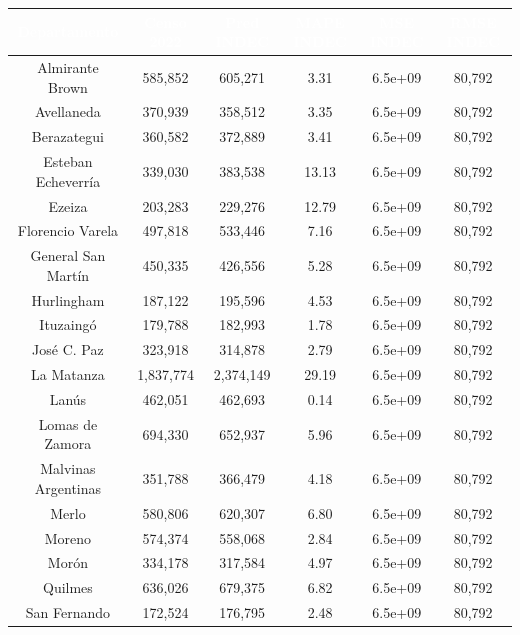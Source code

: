 \documentclass{article}
\theoremstyle{mytheoremstyle}
\theoremstyle{mytheoremstyle}
\theoremstyle{myproblemstyle}
\begin{document}
\begin{table}[htb!]
      \centering
      \begin{tabular}{|c|c|c|c|c|c|}
      \hline
      \textbf{\cellcolor[rgb]{0,0.231,0.427}\textcolor{white}{Departamento}} & \textbf{\cellcolor[rgb]{0,0.231,0.427}\textcolor{white}{Censo 2022}} & \textbf{\cellcolor[rgb]{0,0.231,0.427}\textcolor{white}{Pred INDEC}} & \textbf{\cellcolor[rgb]{0,0.231,0.427}\textcolor{white}{MAPE INDEC}} & \textbf{\cellcolor[rgb]{0,0.231,0.427}\textcolor{white}{MSE INDEC}} & \textbf{\cellcolor[rgb]{0,0.231,0.427}\textcolor{white}{RMSE INDEC}} \\ \hline
      Almirante Brown & 585,852 & 605,271 & 3.31 & 6.5e+09 & 80,792 \\
      Avellaneda & 370,939 & 358,512 & 3.35 & 6.5e+09 & 80,792 \\
      Berazategui & 360,582 & 372,889 & 3.41 & 6.5e+09 & 80,792 \\
      Esteban Echeverría & 339,030 & 383,538 & 13.13 & 6.5e+09 & 80,792 \\
      Ezeiza & 203,283 & 229,276 & 12.79 & 6.5e+09 & 80,792 \\
      Florencio Varela & 497,818 & 533,446 & 7.16 & 6.5e+09 & 80,792 \\
      General San Martín & 450,335 & 426,556 & 5.28 & 6.5e+09 & 80,792 \\
      Hurlingham & 187,122 & 195,596 & 4.53 & 6.5e+09 & 80,792 \\
      Ituzaingó & 179,788 & 182,993 & 1.78 & 6.5e+09 & 80,792 \\
      José C. Paz & 323,918 & 314,878 & 2.79 & 6.5e+09 & 80,792 \\
      La Matanza & 1,837,774 & 2,374,149 & 29.19 & 6.5e+09 & 80,792 \\
      Lanús & 462,051 & 462,693 & 0.14 & 6.5e+09 & 80,792 \\
      Lomas de Zamora & 694,330 & 652,937 & 5.96 & 6.5e+09 & 80,792 \\
      Malvinas Argentinas & 351,788 & 366,479 & 4.18 & 6.5e+09 & 80,792 \\
      Merlo & 580,806 & 620,307 & 6.80 & 6.5e+09 & 80,792 \\
      Moreno & 574,374 & 558,068 & 2.84 & 6.5e+09 & 80,792 \\
      Morón & 334,178 & 317,584 & 4.97 & 6.5e+09 & 80,792 \\
      Quilmes & 636,026 & 679,375 & 6.82 & 6.5e+09 & 80,792 \\
      San Fernando & 172,524 & 176,795 & 2.48 & 6.5e+09 & 80,792 \\

\end{tabular}
\end{table}
\end{document}
